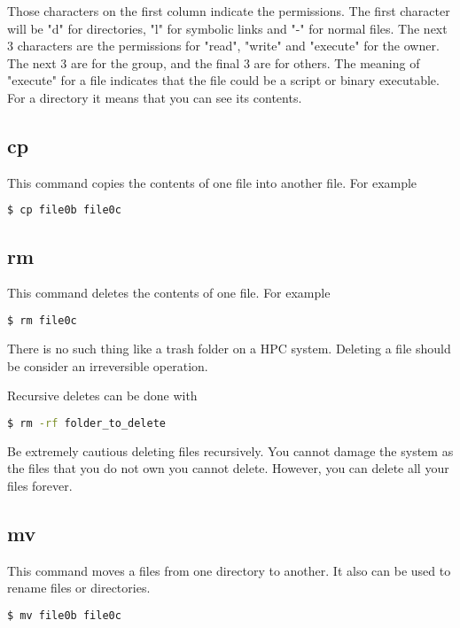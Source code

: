 Those characters on the first column indicate the permissions. The first character will be "d" for directories, "l" for symbolic links and "-" for normal files. The next 3 characters are the permissions for "read", "write" and "execute" for the owner. The next 3 are for the group, and the final 3 are for others.
The meaning of "execute" for a file indicates that the file could be a script or binary executable. For a directory it means that you can see its contents. 

\subsection{cp}

This command copies the contents of one file into another file. For example

\begin{lstlisting}[language=bash]
$ cp file0b file0c
\end{lstlisting}

\subsection{rm}

This command deletes the contents of one file. For example

\begin{lstlisting}[language=bash]
$ rm file0c
\end{lstlisting}

There is no such thing like a trash folder on a HPC system. Deleting a file should be consider an irreversible operation.

Recursive deletes can be done with

\begin{lstlisting}[language=bash]
$ rm -rf folder_to_delete
\end{lstlisting}

Be extremely cautious deleting files recursively. You cannot damage the system as the files that you do not own you cannot delete. However, you can delete all your files forever.

\subsection{mv}

This command moves a files from one directory to another. It also can be used to rename files or directories.

\begin{lstlisting}[language=bash]
$ mv file0b file0c
\end{lstlisting}

